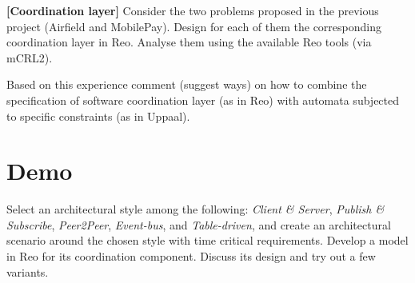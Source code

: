 \documentclass[11pt]{article}
\begin{document}

\begin{exercise} \label{ex:airfield}
\textbf{[Coordination layer]}
Consider the two problems proposed in the previous project (Airfield and MobilePay). Design for each of them the corresponding coordination layer in Reo. Analyse them using the available Reo tools (via mCRL2).

\medskip

Based on this experience comment (suggest ways) on how to combine the specification of software coordination layer (as in Reo) with automata subjected to specific constraints (as in Uppaal).
\end{exercise}



\section*{Demo}


\begin{exercise}  \label{ex:demo}
Select an architectural style among the following: \emph{Client \& Server}, \emph{Publish \& Subscribe}, \emph{Peer2Peer}, \emph{Event-bus}, and \emph{Table-driven}, and create an architectural scenario around the chosen style with time critical requirements. Develop a model in Reo for its coordination component. Discuss its design and try out a few variants.
\end{exercise}


 
\end{document}
